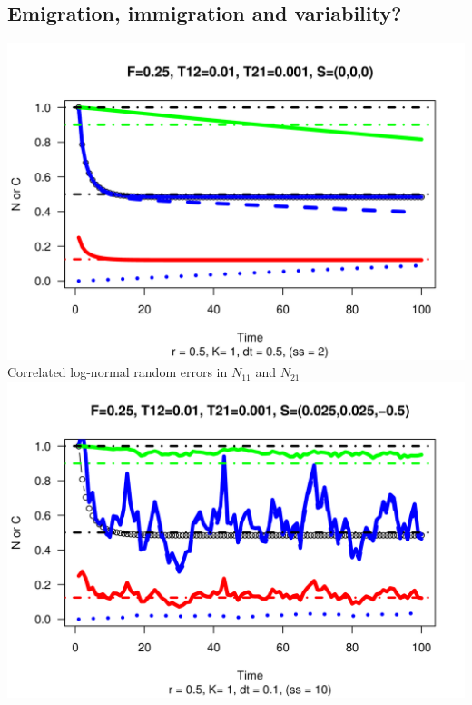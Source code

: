 \documentclass[a4paper,KOMA,landscape,titlepage]{powersem}
\begin{document}
\begin{slide}\section{Emigration, immigration and variability?}
\begin{center}
\includegraphics[height=0.35\textheight]{./graphics/r05F025T12001T210001S000.png}\\
Correlated log-normal random errors in $N_{11}$ and $N_{21}$\\
\includegraphics[height=0.35\textheight]{./graphics/r05F025T12001T210001S00250025-05.png}
\end{center}
\end{slide}
\end{document}
